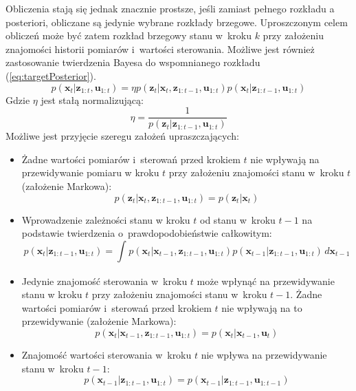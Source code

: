\par Obliczenia stają się jednak znacznie prostsze, jeśli zamiast pełnego rozkładu a posteriori, obliczane są jedynie wybrane rozkłady brzegowe. Uproszczonym celem obliczeń może być zatem rozkład brzegowy stanu w~kroku $k$ przy założeniu znajomości historii pomiarów i~wartości sterowania. Możliwe jest również zastosowanie twierdzenia Bayesa do wspomnianego rozkładu (\ref{eq:targetPosterior}).
\begin{equation} \label{eq:targetPosterior}
	p(\boldsymbol{x}_t|\boldsymbol{z}_{1:t},\boldsymbol{u}_{1:t})=\eta p(\boldsymbol{z}_t|\boldsymbol{x}_t,\boldsymbol{z}_{1:t-1},\boldsymbol{u}_{1:t})p(\boldsymbol{x}_t|\boldsymbol{z}_{1:t-1},\boldsymbol{u}_{1:t})
\end{equation}
Gdzie $\eta$ jest stałą normalizującą: $$\eta=\frac{1}{p(\boldsymbol{z}_t|\boldsymbol{z}_{1:t-1},\boldsymbol{u}_{1:t})}$$
Możliwe jest przyjęcie szeregu założeń upraszczających:
\begin{itemize}
	\item Żadne wartości pomiarów i~sterowań przed krokiem $t$ nie wpływają na przewidywanie pomiaru w kroku $t$ przy założeniu znajomości stanu w~kroku $t$ (założenie Markowa):
	\begin{equation} \label{eq:markovAssumption1}
	p(\boldsymbol{z}_t|\boldsymbol{x}_t,\boldsymbol{z}_{1:t-1},\boldsymbol{u}_{1:t})=p(\boldsymbol{z}_t|\boldsymbol{x}_t)
	\end{equation}
	\item Wprowadzenie zależności stanu w kroku $t$ od stanu w~kroku $t-1$ na podstawie twierdzenia o~prawdopodobieństwie całkowitym:
	\begin{equation} \label{eq:totalProbability}
	p(\boldsymbol{x}_t|\boldsymbol{z}_{1:t-1},\boldsymbol{u}_{1:t})=\int_{}^{}p(\boldsymbol{x}_t|\boldsymbol{x}_{t-1},\boldsymbol{z}_{1:t-1},\boldsymbol{u}_{1:t})p(\boldsymbol{x}_{t-1}|\boldsymbol{z}_{1:t-1},\boldsymbol{u}_{1:t}) \,d\boldsymbol{x}_{t-1}
	\end{equation}
	\item Jedynie znajomość sterowania w~kroku $t$ może wpłynąć na przewidywanie stanu w kroku $t$ przy założeniu znajomości stanu w~kroku $t-1$. Żadne wartości pomiarów i~sterowań przed krokiem $t$ nie wpływają na to przewidywanie (założenie Markowa):
	\begin{equation} \label{eq:markovAssumption2}
	p(\boldsymbol{x}_t|\boldsymbol{x}_{t-1},\boldsymbol{z}_{1:t-1},\boldsymbol{u}_{1:t})=p(\boldsymbol{x}_t|\boldsymbol{x}_{t-1},\boldsymbol{u}_t)
	\end{equation}
	\item Znajomość wartości sterowania w~kroku $t$ nie wpływa na przewidywanie stanu w~kroku $t-1$:
	\begin{equation} \label{eq:independenceAssumption}
	p(\boldsymbol{x}_{t-1}|\boldsymbol{z}_{1:t-1},\boldsymbol{u}_{1:t})=p(\boldsymbol{x}_{t-1}|\boldsymbol{z}_{1:t-1},\boldsymbol{u}_{1:t-1})
	\end{equation}
\end{itemize}
